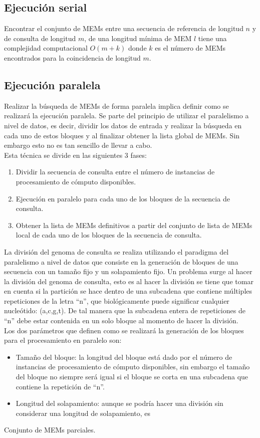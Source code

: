 \documentclass[12pt]{article}
\begin{document}
\subsection{Ejecución serial}
Encontrar el conjunto de MEMs entre una secuencia de referencia de longitud $n$ y de consulta de longitud $m$, de una longitud mínima de MEM $l$ tiene una complejidad computacional $O(m+k)$ donde $k$ es el número de MEMs encontrados para la coincidencia de longitud $m$.\\
\subsection{Ejecución paralela}
Realizar la búsqueda de MEMs de forma paralela implica definir como se realizará la ejecución paralela. Se parte del principio de utilizar el paralelismo a nivel de datos, es decir, dividir los datos de entrada y realizar la búsqueda en cada uno de estos bloques y al finalizar obtener la lista global de MEMs. Sin embargo esto no es tan sencillo de llevar a cabo.\\
Esta t\'ecnica se divide en las siguientes 3 fases:
\begin{enumerate}
  \item Dividir la secuencia de consulta entre el número de instancias de procesamiento de cómputo disponibles.
  \item Ejecución en paralelo para cada uno de los bloques de la secuencia de consulta.
  \item Obtener la lista de MEMs definitivos a partir del conjunto de lista de MEMs local de cada uno de los bloques de la secuencia de consulta.
\end{enumerate}
La división del genoma de consulta se realiza utilizando el paradigma del paralelismo a nivel de datos que consiste en la generación de bloques de una secuencia con un tamaño fijo y un solapamiento fijo. Un problema surge al hacer la división del genoma de consulta, esto es al hacer la división se tiene que tomar en cuenta si la partición se hace dentro de una subcadena que contiene múltiples repeticiones de la letra ``n'', que biológicamente puede significar cualquier nucleótido: (a,c,g,t). De tal manera que la subcadena entera de repeticiones de ``n'' debe estar contenida en un solo bloque al momento de hacer la división.\\
Los dos parámetros que definen como se realizará la generación de los bloques para el procesamiento en paralelo son:
\begin{itemize}
  \item Tamaño del bloque: la longitud del bloque está dado por el número de instancias de procesamiento de cómputo disponibles, sin embargo el tamaño del bloque no siempre será igual si el bloque se corta en una subcadena que contiene la repetición de ``n''.
  \item Longitud del solapamiento: aunque se podría hacer una división sin considerar una longitud de solapamiento, es  
\end{itemize}

\begin{algorithmic}
  \STATE Conjunto de MEMs parciales.
\end{algorithmic}
\end{document}
